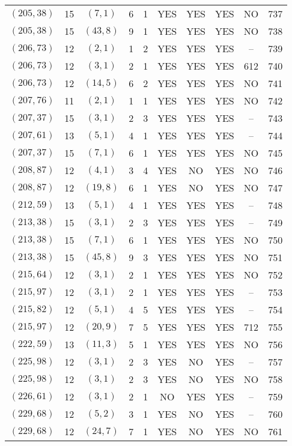 \begin{longtable}{|c|c|c|c|c|c|c|c|c|c|}
$(205, 38)$ & 15 & $(7, 1)$ & 6 & 1 & YES & YES & YES & NO & 737\\
$(205, 38)$ & 15 & $(43, 8)$ & 9 & 1 & YES & YES & YES & NO & 738\\
$(206, 73)$ & 12 & $(2, 1)$ & 1 & 2 & YES & YES & YES & -- & 739\\
$(206, 73)$ & 12 & $(3, 1)$ & 2 & 1 & YES & YES & YES & 612 & 740\\
$(206, 73)$ & 12 & $(14, 5)$ & 6 & 2 & YES & YES & YES & NO & 741\\
$(207, 76)$ & 11 & $(2, 1)$ & 1 & 1 & YES & YES & YES & NO & 742\\
$(207, 37)$ & 15 & $(3, 1)$ & 2 & 3 & YES & YES & YES & -- & 743\\
$(207, 61)$ & 13 & $(5, 1)$ & 4 & 1 & YES & YES & YES & -- & 744\\
$(207, 37)$ & 15 & $(7, 1)$ & 6 & 1 & YES & YES & YES & NO & 745\\
$(208, 87)$ & 12 & $(4, 1)$ & 3 & 4 & YES & NO & YES & NO & 746\\
$(208, 87)$ & 12 & $(19, 8)$ & 6 & 1 & YES & NO & YES & NO & 747\\
$(212, 59)$ & 13 & $(5, 1)$ & 4 & 1 & YES & YES & YES & -- & 748\\
$(213, 38)$ & 15 & $(3, 1)$ & 2 & 3 & YES & YES & YES & -- & 749\\
$(213, 38)$ & 15 & $(7, 1)$ & 6 & 1 & YES & YES & YES & NO & 750\\
$(213, 38)$ & 15 & $(45, 8)$ & 9 & 3 & YES & YES & YES & NO & 751\\
$(215, 64)$ & 12 & $(3, 1)$ & 2 & 1 & YES & YES & YES & NO & 752\\
$(215, 97)$ & 12 & $(3, 1)$ & 2 & 1 & YES & YES & YES & -- & 753\\
$(215, 82)$ & 12 & $(5, 1)$ & 4 & 5 & YES & YES & YES & -- & 754\\
$(215, 97)$ & 12 & $(20, 9)$ & 7 & 5 & YES & YES & YES & 712 & 755\\
$(222, 59)$ & 13 & $(11, 3)$ & 5 & 1 & YES & YES & YES & NO & 756\\
$(225, 98)$ & 12 & $(3, 1)$ & 2 & 3 & YES & NO & YES & -- & 757\\
$(225, 98)$ & 12 & $(3, 1)$ & 2 & 3 & YES & NO & YES & NO & 758\\
$(226, 61)$ & 12 & $(3, 1)$ & 2 & 1 & NO & YES & YES & -- & 759\\
$(229, 68)$ & 12 & $(5, 2)$ & 3 & 1 & YES & NO & YES & -- & 760\\
$(229, 68)$ & 12 & $(24, 7)$ & 7 & 1 & YES & NO & YES & NO & 761\\

\end{longtable}

